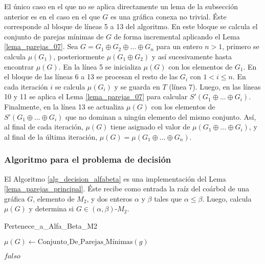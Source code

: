 El único caso en el que no se aplica directamente un lema de la subsección anterior es en el caso en el que $G$ es una gráfica conexa no trivial. Éste corresponde al bloque de líneas 5 a 13 del algoritmo. En este bloque se calcula el conjunto de parejas mínimas de $G$ de forma incremental aplicando el Lema \ref{lema_parejas_07}. Sea $G=G_1\oplus G_2 \oplus \dots \oplus G_n$ para un entero $n>1$, primero se calcula $\mu(G_1)$, posteriormente $\mu(G_1\oplus G_2)$ y así sucesivamente hasta encontrar $\mu(G)$. En la línea 5 se inicializa $\mu(G)$ con los elementos de $G_1$. En el bloque de las líneas 6 a 13 se procesan el resto de las $G_i$ con $1<i\le n$. En cada iteración $i$ se calcula $\mu(G_i)$ y se guarda en $T$ (línea 7). Luego, en las líneas 10 y 11 se aplica el Lema \ref{lema_parejas_07} para calcular $S'(G_1 \oplus \dots \oplus G_i)$. Finalmente, en la línea 13 se actualiza $\mu(G)$ con los elementos de $S'(G_1 \oplus \dots \oplus G_i)$ que no dominan a ningún elemento del mismo conjunto. Así, al final de cada iteración, $\mu(G)$ tiene asignado el valor de $\mu(G_1 \oplus \dots \oplus G_i)$, y al final de la última iteración, $\mu(G)=\mu(G_1 \oplus \dots \oplus G_n)$.


\subsubsection{Algoritmo para el problema de decisión}

El Algoritmo \ref{alg_decision_alfabeta} es una implementación del Lema \ref{lema_parejas_principal}. Éste recibe como entrada la raíz del coárbol de una gráfica $G$, elemento de $M_2$, y dos enteros $\alpha$ y $\beta$ tales que $\alpha \le \beta$. Luego, calcula $\mu(G)$ y determina si $G\in(\alpha,\beta)$-$M_2$.

\begin{algorithm}[ht!]
\caption{Pertenece\_a\_Alfa\_Beta\_M2}
\label{alg_decision_alfabeta}
\DontPrintSemicolon %

$\mu(G) \gets \text{Conjunto\_De\_Parejas\_Mínimas}(g)$\;


\Return $falso$\;

\end{algorithm} 

